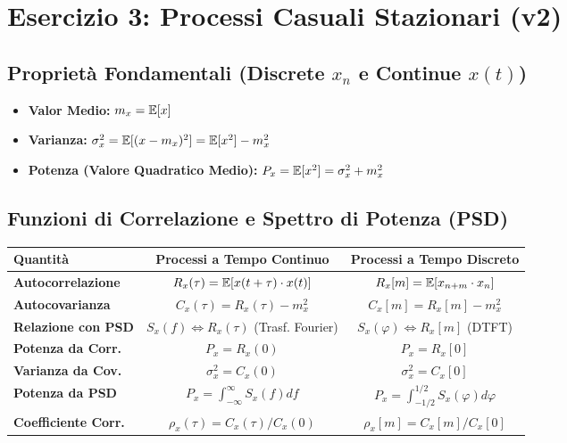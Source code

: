 \chapter{Esercizio 3: Processi Casuali Stazionari (v2)}

\section{Proprietà Fondamentali (Discrete $x_n$ e Continue $x(t)$)}
\begin{itemize}
    \item \textbf{Valor Medio:} $m_x = \mathbb{E}[x]$
    \item \textbf{Varianza:} $\sigma_x^2 = \mathbb{E}[(x - m_x)^2] = \mathbb{E}[x^2] - m_x^2$
    \item \textbf{Potenza (Valore Quadratico Medio):} $P_x = \mathbb{E}[x^2] = \sigma_x^2 + m_x^2$
\end{itemize}

\section{Funzioni di Correlazione e Spettro di Potenza (PSD)}
\begin{table}[h!]
    \centering
    \begin{tabular}{lcc}
        \toprule
        \textbf{Quantità} & \textbf{Processi a Tempo Continuo} & \textbf{Processi a Tempo Discreto} \\
        \midrule
        \textbf{Autocorrelazione} & $R_x(\tau) = \mathbb{E}[x(t+\tau) \cdot x(t)]$ & $R_x[m] = \mathbb{E}[x_{n+m} \cdot x_n]$ \\
        \textbf{Autocovarianza} & $C_x(\tau) = R_x(\tau) - m_x^2$ & $C_x[m] = R_x[m] - m_x^2$ \\
        \textbf{Relazione con PSD} & $S_x(f) \iff R_x(\tau)$ (Trasf. Fourier) & $S_x(\varphi) \iff R_x[m]$ (DTFT) \\
        \textbf{Potenza da Corr.} & $P_x = R_x(0)$ & $P_x = R_x[0]$ \\
        \textbf{Varianza da Cov.} & $\sigma_x^2 = C_x(0)$ & $\sigma_x^2 = C_x[0]$ \\
        \textbf{Potenza da PSD} & $P_x = \int_{-\infty}^{\infty} S_x(f) df$ & $P_x = \int_{-1/2}^{1/2} S_x(\varphi) d\varphi$ \\
        \textbf{Coefficiente Corr.} & $\rho_x(\tau) = C_x(\tau) / C_x(0)$ & $\rho_x[m] = C_x[m] / C_x[0]$ \\
        \bottomrule
    \end{tabular}
\end{table}

